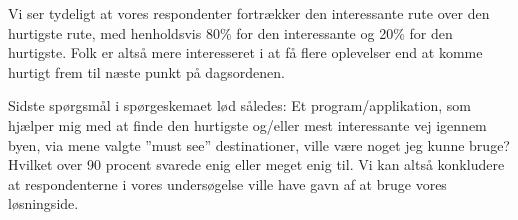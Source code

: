 Vi ser tydeligt at vores respondenter fortrækker den interessante rute over den hurtigste rute, med henholdsvis 80\% for den interessante og 20\% for den hurtigste. Folk er altså mere interesseret i at få flere oplevelser end at komme hurtigt frem til næste punkt på dagsordenen.

Sidste spørgsmål i spørgeskemaet lød således:
Et program/applikation, som hjælper mig med at finde den hurtigste og/eller mest interessante vej igennem byen, via mene valgte ”must see” destinationer, ville være noget jeg kunne bruge?
Hvilket over 90 procent svarede enig eller meget enig til. Vi kan altså konkludere at respondenterne i vores undersøgelse ville have gavn af at bruge vores løsningside. 